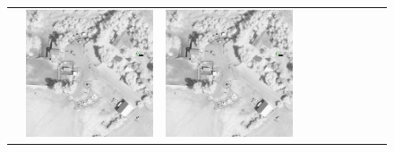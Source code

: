 \begin{figure}[h!]
\begin{tabularx}{\textwidth}{c|*{9}{X}}
    & \includegraphics[trim={730pt 220pt 200pt 720pt},clip,width=\linewidth]{images/015Results/03ablation/comp_images/ir/523.png}
    & \includegraphics[trim={850pt 110pt 80pt 830pt},clip,width=\linewidth]{images/015Results/03ablation/comp_images/ir/523.png}

\end{tabularx}
\end{figure}
